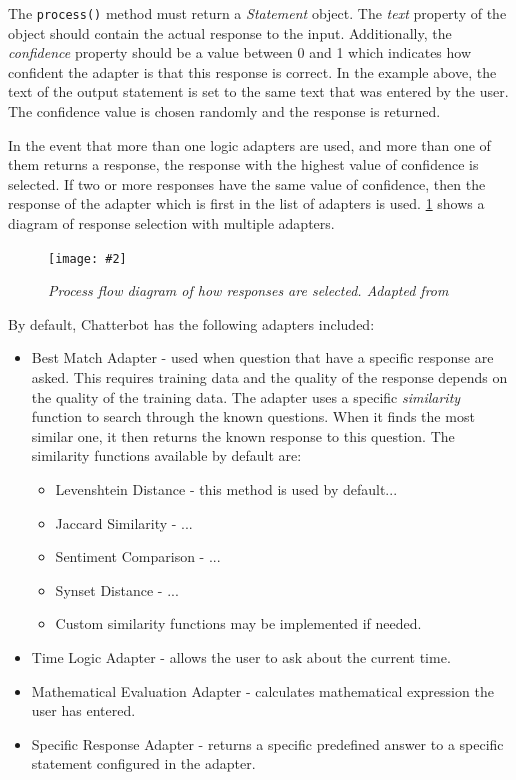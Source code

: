 \documentclass[12pt,a4paper]{article}
\newcommand{\figuremacro}[5]{
    \begin{figure}[#1]
        \centering
        \texttt{[image: \#2]}
        \caption[#3]{\textbf{#3}#4}
        \label{fig:#2}
    \end{figure}
}
\begin{document}
The \texttt{process()} method must return a \textit{Statement} object. The \textit{text} property of the object should contain the actual response to the input. Additionally, the \textit{confidence} property should be a value between 0 and 1 which indicates how confident the adapter is that this response is correct. In the example above, the text of the output statement is set to the same text that was entered by the user. The confidence value is chosen randomly and the response is returned. 

In the event that more than one logic adapters are used, and more than one of them returns a response, the response with the highest value of confidence is selected. If two or more responses have the same value of confidence, then the response of the adapter which is first in the list of adapters is used. \cref{fig:dialog-processing-flow} shows a diagram of response selection with multiple adapters.

\figuremacro{h}{dialog-processing-flow}{}{\small{\textit{Process flow diagram of how responses are selected. Adapted from \cite{Chatterbot:online}}}}{0.7}  

By default, Chatterbot has the following adapters included:
\begin{itemize}
    \item Best Match Adapter - used when question that have a specific response are asked. This requires training data and the quality of the response depends on the quality of the training data. The adapter uses a specific \textit{similarity} function to search through the known questions. When it finds the most similar one, it then returns the known response to this question. The similarity functions available by default are:
        \begin{itemize}
            \item Levenshtein Distance - this method is used by default...
            \item Jaccard Similarity - ...
            \item Sentiment Comparison - ...
            \item Synset Distance - ...
            \item Custom similarity functions may be implemented if needed.
        \end{itemize}
    \item Time Logic Adapter - allows the user to ask about the current time.
    \item Mathematical Evaluation Adapter - calculates mathematical expression the user has entered.
    \item Specific Response Adapter - returns a specific predefined answer to a specific statement configured in the adapter.
\end{itemize}
\end{document}
